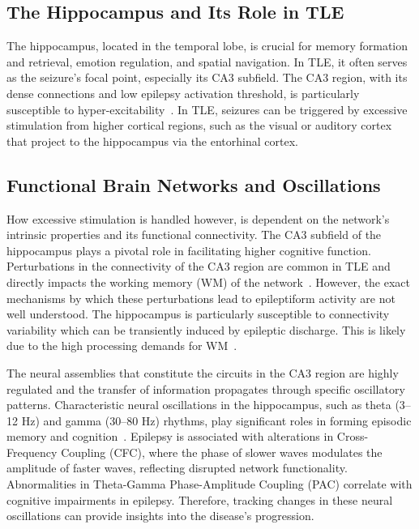 \subsection{The Hippocampus and Its Role in TLE}
The hippocampus, located in the temporal lobe, is crucial for memory formation 
and retrieval, emotion regulation, and spatial navigation. In TLE, it often 
serves as the seizure's focal point, especially its CA3 subfield. The CA3 region, 
with its dense connections and low epilepsy activation threshold, is particularly 
susceptible to hyper-excitability~\parencite{witterIntrinsicExtrinsicWiring2007}. 
In TLE, seizures can be triggered by excessive stimulation from higher cortical regions, such as the visual or auditory cortex
that project to the hippocampus via the entorhinal cortex.

\subsection{Functional Brain Networks and Oscillations}
How excessive stimulation is handled however, is dependent on the network's intrinsic properties and its functional connectivity.
The CA3 subfield of the hippocampus plays a pivotal role in facilitating higher cognitive function. 
Perturbations in the connectivity of the CA3 region are common in TLE and directly impacts the working memory (WM)
of the network~\parencite{arskiOscillatoryBasisWorking2021}. However, the exact mechanisms by which these perturbations lead to epileptiform 
activity are not well understood. The hippocampus is particularly susceptible to connectivity variability which can be transiently induced by epileptic discharge. 
This is likely due to the high processing demands for WM~\parencite{aldenkampEffectsEpileptiformEEG2004}.

The neural assemblies that constitute the circuits in the CA3 region are highly regulated and the transfer of 
information propagates through specific oscillatory patterns. 
Characteristic neural oscillations in the hippocampus, such as theta (3--12 Hz) 
and gamma (30--80 Hz) rhythms, play significant roles in forming episodic memory and cognition~\parencite{nyhusFunctionalRoleGamma2010}. 
Epilepsy is associated with alterations in Cross-Frequency Coupling (CFC), where 
the phase of slower waves modulates the amplitude of faster waves, reflecting 
disrupted network functionality. Abnormalities in Theta-Gamma Phase-Amplitude 
Coupling (PAC) correlate with cognitive impairments in epilepsy. Therefore, tracking changes
in these neural oscillations can provide insights into the disease's progression.

